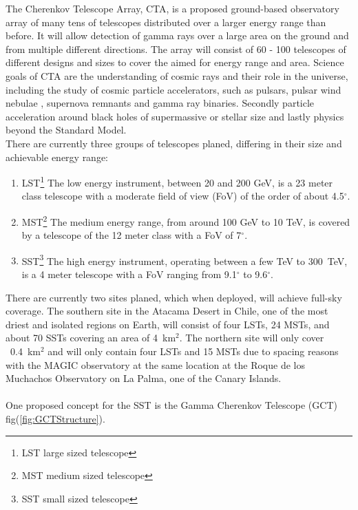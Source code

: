 \documentclass[12pt,article,type=msc,colorback,accentcolor=tud9c]{tudthesis}
\begin{document}
The Cherenkov Telescope Array, CTA, is a proposed ground-based observatory array of many tens of telescopes distributed over a larger energy range than before. It will allow detection of gamma rays over a large area on the ground and from multiple different directions. The array will consist of 60 - 100 telescopes of different designs and sizes to cover the aimed for energy range and area. Science goals of CTA are the understanding of cosmic rays and their role in the universe, including the study of cosmic particle accelerators, such as pulsars, pulsar wind nebulae , supernova remnants and gamma ray binaries. Secondly particle acceleration around black holes of supermassive or stellar size and lastly physics beyond the Standard Model.\\
There are currently three groups of telescopes planed, differing in their size and achievable energy range:\cite{CTADesign}
\begin{enumerate}
\item LST\footnote{LST large sized telescope} The low energy instrument, between 20 and 200 GeV, is a 23 meter class telescope with a moderate field of view (FoV) of the order of about 4.5$^\circ$.
\item MST\footnote{MST medium sized telescope} The medium energy range, from around 100 GeV to 10 TeV, is covered by a telescope of the 12 meter class with a FoV of 7$^\circ$.
\item SST\footnote{SST small sized telescope} The high energy instrument, operating between a few TeV to 300~TeV, is a 4 meter telescope with a FoV ranging from 9.1$^\circ$ to 9.6$^\circ$.
\end{enumerate}
There are currently two sites planed, which when deployed, will achieve full-sky coverage. The southern site in the Atacama Desert in Chile, one of the most driest and isolated regions on Earth, will consist of four LSTs, 24 MSTs, and about 70 SSTs covering an area of 4~km$^2$. The northern site will only cover ~0.4~km$^2$ and will only contain four LSTs and 15 MSTs due to spacing reasons with the MAGIC observatory at the same location at the Roque de los Muchachos Observatory on La Palma, one of the Canary Islands.\\\\
\noindent
One proposed concept for the SST is the Gamma Cherenkov Telescope (GCT) fig(\ref{fig:GCTStructure}).\\
\end{document}
